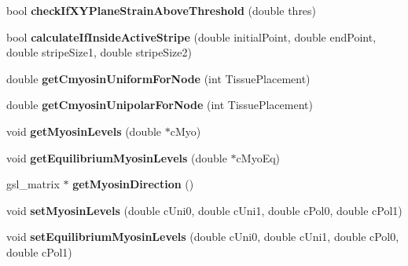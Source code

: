 \begin{DoxyCompactItemize}
\item 
\hypertarget{classShapeBase_a61b4685d3e89fae029b56ca3f81fb5d6}{}bool {\bfseries check\+If\+X\+Y\+Plane\+Strain\+Above\+Threshold} (double thres)\label{classShapeBase_a61b4685d3e89fae029b56ca3f81fb5d6}

\item 
\hypertarget{classShapeBase_abfb5933433de7f4f6c58734be0faeac2}{}bool {\bfseries calculate\+If\+Inside\+Active\+Stripe} (double initial\+Point, double end\+Point, double stripe\+Size1, double stripe\+Size2)\label{classShapeBase_abfb5933433de7f4f6c58734be0faeac2}

\item 
\hypertarget{classShapeBase_a1a1d8053c99109b0c13b06b2cca44dee}{}double {\bfseries get\+Cmyosin\+Uniform\+For\+Node} (int Tissue\+Placement)\label{classShapeBase_a1a1d8053c99109b0c13b06b2cca44dee}

\item 
\hypertarget{classShapeBase_a69ec8a1780b516d47560a25ba17f672a}{}double {\bfseries get\+Cmyosin\+Unipolar\+For\+Node} (int Tissue\+Placement)\label{classShapeBase_a69ec8a1780b516d47560a25ba17f672a}

\item 
\hypertarget{classShapeBase_afa44aa076cefed9d57f61dce7574832a}{}void {\bfseries get\+Myosin\+Levels} (double $\ast$c\+Myo)\label{classShapeBase_afa44aa076cefed9d57f61dce7574832a}

\item 
\hypertarget{classShapeBase_ab31ad5e068aeb94f4e851b64d966547a}{}void {\bfseries get\+Equilibrium\+Myosin\+Levels} (double $\ast$c\+Myo\+Eq)\label{classShapeBase_ab31ad5e068aeb94f4e851b64d966547a}

\item 
\hypertarget{classShapeBase_ad4f62dbbaf09f82cde600361a7926aaa}{}gsl\+\_\+matrix $\ast$ {\bfseries get\+Myosin\+Direction} ()\label{classShapeBase_ad4f62dbbaf09f82cde600361a7926aaa}

\item 
\hypertarget{classShapeBase_afbcfcd90f0942e917fdc1deb1df1be1c}{}void {\bfseries set\+Myosin\+Levels} (double c\+Uni0, double c\+Uni1, double c\+Pol0, double c\+Pol1)\label{classShapeBase_afbcfcd90f0942e917fdc1deb1df1be1c}

\item 
\hypertarget{classShapeBase_adef29b02faa010719b0810d3643c6b62}{}void {\bfseries set\+Equilibrium\+Myosin\+Levels} (double c\+Uni0, double c\+Uni1, double c\+Pol0, double c\+Pol1)\label{classShapeBase_adef29b02faa010719b0810d3643c6b62}


\end{DoxyCompactItemize}
